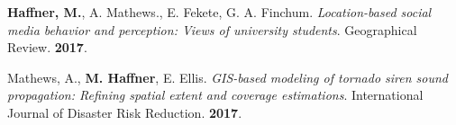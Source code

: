 




\begin{cventries}
   \cventry
      {}
      {}
      {}
      {}
      {
        \begin{cvitems}
          \vspace{-4mm}
        \item {\textbf{Haffner, M.}, A. Mathews., E. Fekete, G. A. Finchum.
            \textit{Location-based social media behavior and perception: Views
              of university students}. Geographical Review. \textbf{2017}.} \\
          \vspace{-2mm}
        \end{cvitems}
    }
   \cventry
      {}
      {}
      {}
      {}
      {
        \begin{cvitems}
          \vspace{-4mm}
        \item
          {Mathews, A., \textbf{M. Haffner}, E. Ellis.
            \textit{GIS-based modeling of tornado siren sound propagation:
              Refining spatial extent and coverage estimations}. International
            Journal of Disaster Risk Reduction. \textbf{2017}.} \\
          \vspace{-2mm}
        \end{cvitems}
    }
\end{cventries}



